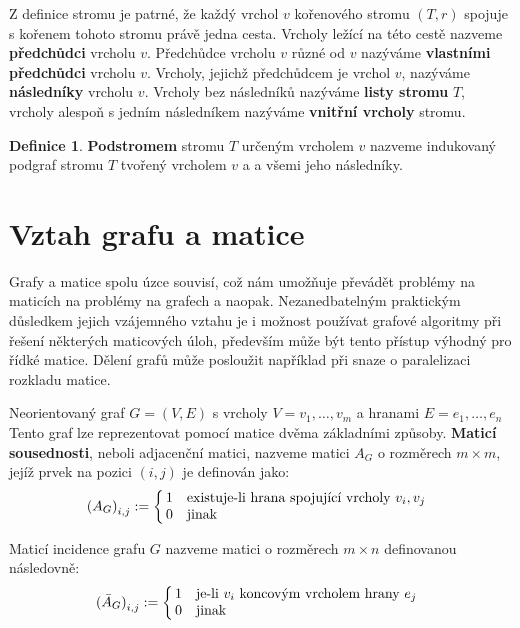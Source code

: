 \documentclass[11pt,american,czech,oneside]{book}
\theoremstyle{plain}
\theoremstyle{definition}
\newtheorem{definition}{Definice}
\begin{document}
Z definice stromu je patrné, že každý vrchol $v$ kořenového stromu $(T,r)$ spojuje s kořenem tohoto stromu právě jedna cesta.
Vrcholy ležící na této cestě nazveme \textbf{předchůdci} vrcholu $v$. Předchůdce vrcholu $v$ různé od $v$ nazýváme \textbf{vlastními předchůdci} vrcholu $v$. Vrcholy, jejichž předchůdcem je vrchol $v$, nazýváme \textbf{následníky} vrcholu $v$. Vrcholy bez následníků nazýváme \textbf{listy stromu} $T$, vrcholy alespoň s jedním následníkem nazýváme \textbf{vnitřní vrcholy} stromu.

\begin{definition}
  \textbf{Podstromem} stromu $T$ určeným vrcholem $v$ nazveme indukovaný podgraf stromu $T$ tvořený vrcholem $v$ a a všemi jeho následníky.
\end{definition}

\section{Vztah grafu a matice}

Grafy a matice spolu úzce souvisí, což nám umožňuje převádět problémy na maticích na problémy na grafech a naopak. Nezanedbatelným praktickým důsledkem jejich vzájemného vztahu je i možnost používat grafové algoritmy při řešení některých maticových úloh, především může být tento přístup výhodný pro řídké matice. Dělení grafů může posloužit například při snaze o paralelizaci rozkladu matice.

Neorientovaný graf $G=(V,E)$ s vrcholy $V = {v_1, \ldots, v_m}$ a hranami $E = {e_1, \ldots, e_n}$ Tento graf lze reprezentovat pomocí matice dvěma základními způsoby. \textbf{Maticí sousednosti}, neboli adjacenční matici, nazveme matici $A_G$ o rozměrech $m \times m$, jejíž prvek na pozici $(i,j)$ je definován jako:
\[
  {(A_G)}_{i,j} :=
  \left\{
    \begin{array}{@{\,}ll}
      1  & \mbox{existuje-li hrana spojující vrcholy $v_i, v_j$} \\
      0  & \mbox{jinak}
    \end{array}
  \right.
\]

Maticí incidence grafu $G$ nazveme matici o rozměrech $m \times n$  definovanou následovně:
\[
  {(\bar{A}_G)}_{i,j} :=
  \left\{
	  \begin{array}{@{\,}ll}
		  1  & \mbox{je-li $v_i$ koncovým vrcholem hrany $e_j$} \\
		  0  & \mbox{jinak}
	  \end{array}
  \right.
\]
\end{document}
